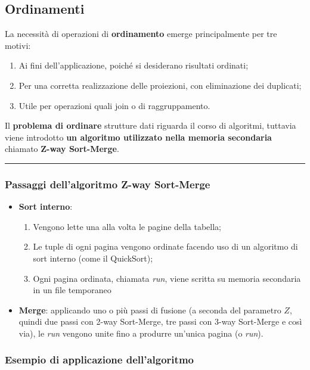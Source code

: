 \documentclass[a4paper]{article}
\newcommand{\longline}{\noindent\rule{\textwidth}{0.4pt}}
\begin{document}
	\subsection{Ordinamenti}
	
	La necessità di operazioni di \textcolor{Red3}{\textbf{ordinamento}} emerge principalmente per tre motivi:
	\begin{enumerate}
		\item Ai fini dell'applicazione, poiché si desiderano risultati ordinati;		
		\item Per una corretta realizzazione delle proiezioni, con eliminazione dei duplicati;
		\item Utile per operazioni quali join o di raggruppamento.
	\end{enumerate}
	Il \textbf{problema di ordinare} strutture dati riguarda il corso di algoritmi, tuttavia viene introdotto \textbf{un algoritmo utilizzato nella memoria secondaria} chiamato \textbf{Z-way Sort-Merge}.
	
	\longline
	
	\subsubsection{Passaggi dell'algoritmo Z-way Sort-Merge}

	\begin{itemize}
		\item \textbf{Sort interno}:
		\begin{enumerate}
			\item Vengono lette una alla volta le pagine della tabella;
			\item Le tuple di ogni pagina vengono ordinate facendo uso di un algoritmo di sort interno (come il QuickSort);
			\item Ogni pagina ordinata, chiamata \emph{run}, viene scritta su memoria secondaria in un file temporaneo
		\end{enumerate}
		
		\item \textbf{Merge}: applicando uno o più passi di fusione (a seconda del parametro $Z$, quindi due passi con 2-way Sort-Merge, tre passi con 3-way Sort-Merge e così via), le \emph{run} vengono unite fino a produrre un'unica pagina (o \emph{run}).
	\end{itemize}\newpage
	
	\subsubsection{Esempio di applicazione dell'algoritmo}
	
\end{document}
